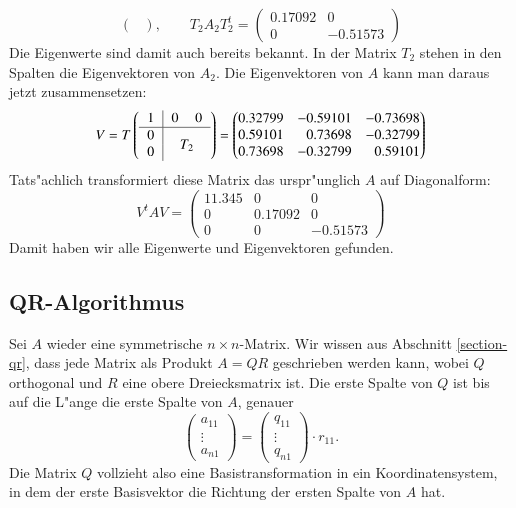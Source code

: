\begin{beispiel}
\[\begin{pmatrix}
\end{pmatrix},\qquad
T_2A_2T_2^t=
\begin{pmatrix}
   0.17092&        0\\
         0& -0.51573
\end{pmatrix}
\]
Die Eigenwerte sind damit auch bereits bekannt.
In der Matrix $T_2$ stehen in den Spalten die Eigenvektoren
von $A_2$. Die Eigenvektoren von $A$ kann man daraus jetzt
zusammensetzen:
\[
V=
T\left(
\begin{tabular}{>{$}c<{$}|>{$}c<{$}>{$}c<{$}}
1&0&0\\
\hline
0&\multicolumn{2}{c}{\raisebox{-1.5ex}[0cm][0cm]{$T_2$}}\\
0
\end{tabular}
\right)
=\begin{pmatrix}
   0.32799&            -0.59101&           -0.73698\\
   0.59101& \phantom{-} 0.73698&           -0.32799\\
   0.73698&            -0.32799& \phantom{-}0.59101
\end{pmatrix}
\]
Tats"achlich transformiert diese Matrix das urspr"unglich $A$ auf
Diagonalform:
\[
V^tAV=\begin{pmatrix}
11.345&0&0\\
0&0.17092&0\\
0&0&-0.51573
\end{pmatrix}
\]
Damit haben wir alle Eigenwerte und Eigenvektoren gefunden.
\end{beispiel}

\subsection{QR-Algorithmus}
Sei $A$ wieder eine symmetrische $n\times n$-Matrix. Wir wissen aus
Abschnitt \ref{section-qr}, dass jede Matrix als Produkt $A=QR$
geschrieben werden kann, wobei $Q$ orthogonal und $R$ eine obere
Dreiecksmatrix ist. 
Die erste Spalte von $Q$ ist bis auf die L"ange die erste Spalte
von $A$, genauer
\[
\begin{pmatrix}a_{11}\\\vdots\\a_{n1} \end{pmatrix}
=
\begin{pmatrix}q_{11}\\\vdots\\q_{n1} \end{pmatrix}\cdot r_{11}.
\]
Die Matrix $Q$ vollzieht also eine Basistransformation
in ein Koordinatensystem, in dem der erste Basisvektor die Richtung
der ersten Spalte von $A$ hat.

